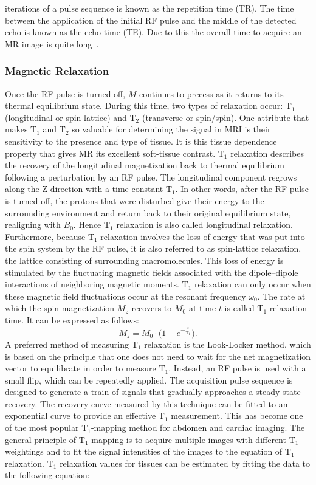\documentclass[english,version-2022-01]{uzl-thesis} %
\begin{document}
iterations of a pulse sequence is known as the repetition time (TR). The time between the application of the initial RF pulse and the middle of the detected echo is known as the echo time (TE). Due to this the overall time to acquire an MR image is quite long~\cite{Serai2021}.\\

\subsubsection{Magnetic Relaxation}
Once the RF pulse is turned off, $M$ continues to precess as it returns to its thermal equilibrium state. During this time, two types of relaxation occur: $\text{T}_1$ (longitudinal or spin lattice) and $\text{T}_2$ (transverse or spin/spin). One attribute that makes $\text{T}_1$ and $\text{T}_2$ so valuable for determining the signal in MRI is their sensitivity to the presence and type of tissue. It is this tissue dependence property that gives MR its excellent soft-tissue contrast. $\text{T}_1$ relaxation describes the recovery of the longitudinal magnetization back to thermal equilibrium following a perturbation by an RF pulse. The longitudinal component regrows along the Z direction with a time constant $\text{T}_1$. In other words, after the RF pulse is turned off, the protons that were disturbed give their energy to the surrounding environment and return back to their original equilibrium state, realigning with $B_0$. Hence $\text{T}_1$ relaxation is also called longitudinal relaxation. Furthermore, because $\text{T}_1$ relaxation involves the loss of energy that was put into the spin system by the RF pulse, it is also referred to as spin-lattice relaxation, the lattice consisting of surrounding macromolecules. This loss of energy is stimulated by the fluctuating magnetic fields associated with the dipole–dipole interactions of neighboring magnetic moments. $\text{T}_1$ relaxation can only occur when these magnetic field fluctuations occur at the resonant frequency $\omega_0$. The rate at which the spin magnetization $M_z$ recovers to $M_0$ at time $t$ is called $\text{T}_1$ relaxation time. It can be expressed as follows:
\begin{equation}
	M_z = M_0 \cdot \bigg(1 - e^{-\frac{t}{\text{T}_1}} \bigg).
\end{equation}
A preferred method of measuring $\text{T}_1$ relaxation is the Look-Locker method, which is based on the principle that one does not need to wait for the net magnetization vector to equilibrate in order to measure $\text{T}_1$. Instead, an RF pulse is used with a small flip, which can be repeatedly applied. The acquisition pulse sequence is designed to generate a train of signals that gradually approaches a steady-state recovery. The recovery curve measured by this technique can be fitted to an exponential curve to provide an effective $\text{T}_1$ measurement. This has become one of the most popular $\text{T}_1$-mapping method for abdomen and cardiac imaging. The general principle of $\text{T}_1$ mapping is to acquire multiple images with different $\text{T}_1$ weightings and to fit the signal intensities of the images to the equation of $\text{T}_1$ relaxation. $\text{T}_1$ relaxation values for tissues can be estimated by fitting the data to the following equation:
\end{document}
